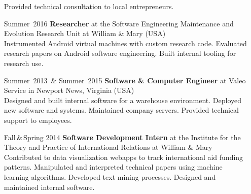 \documentclass{res}     %
\begin{document}
\begin{resume}
\begin{itemize}[font=\itshape,align=parleft,labelwidth=3cm,leftmargin=2cm]
        Provided technical consultation to local entrepreneurs.
    \item[Summer~2016]
        \textbf{Researcher}
        at the Software Engineering Maintenance and Evolution Research Unit
        at William \& Mary (USA)
        \vspace{1mm} \\
        Instrumented Android virtual machines with custom research code.
        Evaluated research papers on Android software engineering.
        Built internal tooling for research use.
    \item[Summer~2013~\& Summer~2015]
        \textbf{Software \& Computer Engineer}
        at Valeo Service
        in Newport News, Virginia (USA)
        \vspace{1mm} \\
        Designed and built internal software for a warehouse environment.
        Deployed new software and systems.
        Maintained company servers.
        Provided technical support to employees.
    \item[Fall\,\&\,Spring 2014]
        \textbf{Software Development Intern}
        at the Institute for the Theory and Practice of International Relations
        at William \& Mary
        \vspace{1mm} \\
        Contributed to data visualization webapps to track international aid funding patterns.
        Manipulated and interpreted technical papers using machine learning algorithms.
        Developed text mining processes.
        Designed and maintained internal software.
\end{itemize}


\end{resume}
\end{document}
